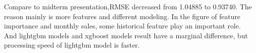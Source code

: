 \documentclass{tikzposter} %
\begin{document}
\begin{columns}
{
\begin{description}


  \item
  Compare to midterm presentation,RMSE decreased from 1.04885 to 0.93740. The \\
reason mainly is more features and different modeling. In the figure of feature \\
importance and monthly sales, some historical feature play an important role. \\
And lightgbm models and xgboost models result have a marginal difference, but \\
processing speed of lightgbm model is faster.
\end{description}
}





\end{columns}


\end{document}
